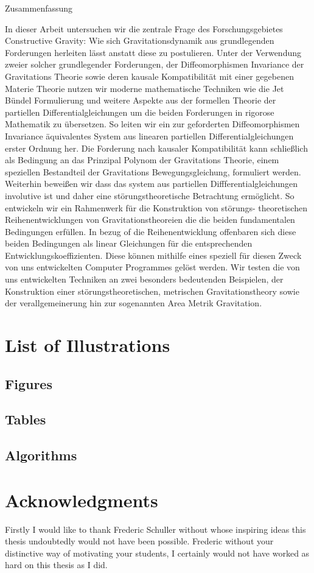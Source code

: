 \documentclass[a4paper,12pt, DIV=14, BCOR=5mm, twoside, headsepline, numbers=noenddot]{scrbook}
\makeatletter
\providecommand\phantomsection{}
\newcommand\listofillustrations{
    \chapter*{List of Illustrations}
    \phantomsection
    \section*{Figures}
    \phantomsection
    \@starttoc{lof}%
    \bigskip
    \section*{Tables}%
    \phantomsection
    \@starttoc{lot}%
    \bigskip
    \section*{Algorithms}%
    \phantomsection
    \@starttoc{loa}
    }
\newenvironment{Zusammenfassung}{%
  \titlepage%
  \null\vfil%
  \begin{center}\normalfont\usekomafont{disposition}Zusammenfassung\end{center}%
}{%
  \par
  \vfil\null%
  \endtitlepage%
}
\makeatother
\begin{document}
\begin{Zusammenfassung}
In dieser Arbeit untersuchen wir die zentrale Frage des Forschungsgebietes Constructive Gravity: Wie sich Gravitationsdynamik aus grundlegenden Forderungen herleiten lässt anstatt diese zu postulieren.
Unter der Verwendung zweier solcher grundlegender Forderungen, der Diffeomorphismen Invariance der Gravitations Theorie sowie deren kausale Kompatibilität mit einer gegebenen Materie Theorie nutzen wir moderne mathematische Techniken wie die Jet Bündel Formulierung und weitere Aspekte aus der formellen Theorie der partiellen Differentialgleichungen um die beiden Forderungen in rigorose Mathematik zu übersetzen. So leiten wir ein zur geforderten Diffeomorphismen Invariance äquivalentes System aus linearen partiellen Differentialgleichungen erster Ordnung her. Die Forderung nach kausaler Kompatibilität kann schließlich als Bedingung an das Prinzipal Polynom der Gravitations Theorie, einem speziellen Bestandteil der Gravitations Bewegungsgleichung, formuliert werden. 
Weiterhin beweißen wir dass das system aus partiellen Diffferentialgleichungen involutive ist und daher eine störungstheoretische Betrachtung ermöglicht. So entwickeln wir ein Rahmenwerk für die Konstruktion von störungs-
theoretischen Reihenentwicklungen von Gravitationstheoreien die die beiden fundamentalen Bedingungen erfüllen. In bezug of die Reihenentwicklung offenbaren sich diese beiden Bedingungen als linear Gleichungen für die entsprechenden Entwicklungskoeffizienten. Diese können mithilfe eines speziell für diesen Zweck von uns entwickelten Computer Programmes gelöst werden.
Wir testen die von uns entwickelten Techniken an zwei besonders bedeutenden Beispielen, der Konstruktion einer störungstheoretischen, metrischen Gravitationstheory sowie der verallgemeinerung hin zur sogenannten Area Metrik Gravitation. 
\end{Zusammenfassung}

\tableofcontents

\listofillustrations

\listoflistings

\chapter*{Acknowledgments}
Firstly I would like to thank Frederic Schuller without whose inspiring ideas this thesis undoubtedly would not have been possible. Frederic without your distinctive way of motivating your students, I certainly would not have worked as hard on this thesis as I did.
\end{document}
